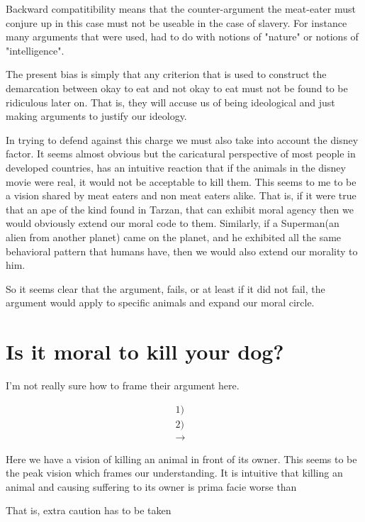 \documentclass[12pt]{report}
\numberwithin{equation}{section}
\begin{document}
Backward compatitibility means that the counter-argument the meat-eater must conjure up in this case must not be useable in the case of slavery. For instance many arguments that were used, had to do with notions of "nature" or notions of "intelligence".

The present bias is simply that any criterion that is used to construct the demarcation between okay to eat and not okay to eat must not be found to be ridiculous later on. That is, they will accuse us of being ideological and just making arguments to justify our ideology. 

In trying to defend against this charge we must also take into account the disney factor. It seems almost obvious but the caricatural perspective of most people in developed countries, has an intuitive reaction that if the animals in the disney movie were real, it would not be acceptable to kill them. This seems to me to be a vision shared by meat eaters and non meat eaters alike. That is, if it were true that an ape of the kind found in Tarzan, that can exhibit moral agency then we would obviously extend our moral code to them. Similarly, if a Superman(an alien from another planet) came on the planet, and he exhibited all the same behavioral pattern that humans have, then we would also extend our morality to him. 

So it seems clear that the argument, fails, or at least if it did not fail, the argument would apply to specific animals and expand our moral circle. 

\section{Is it moral to kill your dog?}

I'm not really sure how to frame their argument here. 

\begin{mdframed}[style=MyFrame]
\begin{align*}
1)& \text{} \\
2)& \text{} \\
\rightarrow& \text{}
\end{align*}
\end{mdframed}

Here we have a vision of killing an animal in front of its owner. This seems to be the peak vision which frames our understanding. It is intuitive that killing an animal and causing suffering to its owner is prima facie worse than 


That is, extra caution has to be taken
\end{document}
